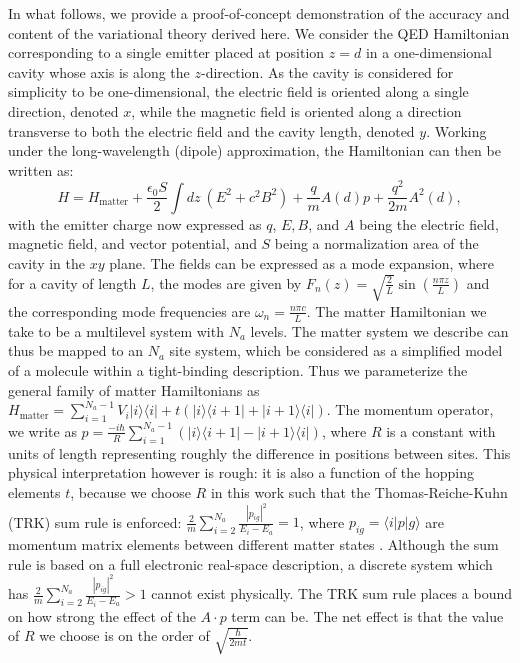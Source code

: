 \documentclass[aps,prl,twocolumn,
	groupedaddress,superscriptaddress,
	amsfonts,amssymb,amsmath,floatfix,
	citeautoscript]{revtex4-1}
\begin{document}
In what follows, we provide a proof-of-concept demonstration of the accuracy and content of the variational theory derived here. We consider the QED Hamiltonian corresponding to a single emitter placed at position $z=d$ in a one-dimensional cavity whose axis is along the $z$-direction. As the cavity is considered for simplicity to be one-dimensional, the electric field is oriented along a single direction, denoted $x$, while the magnetic field is oriented along a direction transverse to both the electric field and the cavity length, denoted $y$. Working under the long-wavelength (dipole) approximation, the Hamiltonian can then be written as:
\begin{equation}\label{eq:hamiltonian}
H = H_{\text{matter}}+\frac{\epsilon_0S}{2}\int dz~(E^2+c^2B^2)+\frac{q}{m}A(d)p + \frac{q^2}{2m}A^2(d),
\end{equation}
with the emitter charge now expressed as $q$, $E, B$, and $A$ being the electric field, magnetic field, and vector potential, and $S$ being a normalization area of the cavity in the $xy$ plane. The fields can be expressed as a mode expansion, where for a cavity of length $L$, the modes are given by $F_n(z) = \sqrt{\frac{2}{L}}\sin\left(\frac{n\pi z}{L} \right)$ and the corresponding mode frequencies are $\omega_n = \frac{n\pi c}{L}$. The matter Hamiltonian we take to be a multilevel system with $N_a$ levels. The matter system we describe can thus be mapped to an $N_a$ site system, which be considered as a simplified model of a molecule within a tight-binding description. Thus we parameterize the general family of matter Hamiltonians as $H_{\text{matter}} = \sum\limits_{i=1}^{{N_a-1}} V_i|i\rangle\langle i|+t(|i\rangle\langle i+1|+|i+1\rangle\langle i|)$. The momentum operator, we write as $p = \frac{-i\hbar}{R}\sum\limits_{i=1}^{N_a-1} \left(|i\rangle\langle i+1|-|i+1\rangle\langle i| \right)$,
where $R$ is a constant with units of length representing roughly the difference in positions between sites. This physical interpretation however is rough: it is also a function of the hopping elements $t$, because we choose $R$ in this work such that the Thomas-Reiche-Kuhn (TRK) sum rule is enforced: $\frac{2}{m}\sum\limits_{i=2}^{N_a}\frac{|p_{ig}|^2}{E_i - E_a} = 1$, where $p_{ig} = \langle i|p|g\rangle$ are momentum matrix elements between different matter states \cite{cohen1992}.  Although the sum rule is based on a full electronic real-space description, a discrete system which has  $\frac{2}{m}\sum\limits_{i=2}^{N_a}\frac{|p_{ig}|^2}{E_i - E_a} > 1$ cannot exist physically. The TRK sum rule places a bound on how strong the effect of the $A\cdot p$ term can be. The net effect is that the value of $R$ we choose is on the order of $\sqrt{\frac{\hbar}{2mt}}$. %
\end{document}
